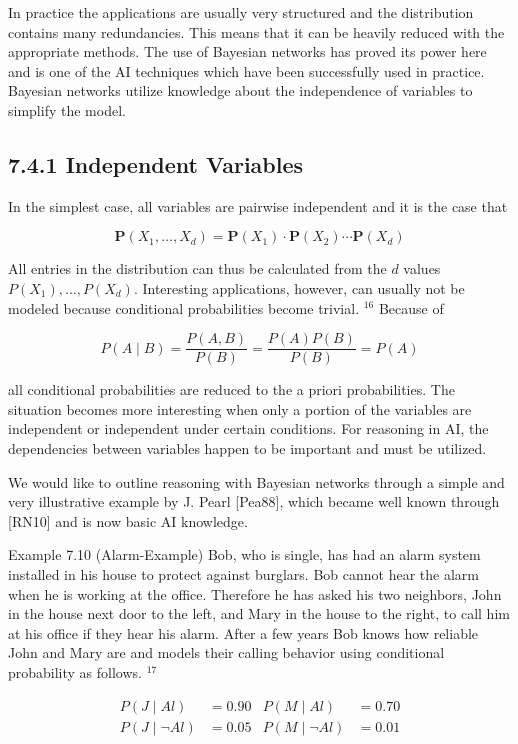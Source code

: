 \documentclass[10pt]{article}
\begin{document}
In practice the applications are usually very structured and the distribution contains many redundancies. This means that it can be heavily reduced with the appropriate methods. The use of Bayesian networks has proved its power here and is one of the AI techniques which have been successfully used in practice. Bayesian networks utilize knowledge about the independence of variables to simplify the model.

\subsection*{7.4.1 Independent Variables}
In the simplest case, all variables are pairwise independent and it is the case that

$$
\boldsymbol{P}\left(X_{1}, \ldots, X_{d}\right)=\boldsymbol{P}\left(X_{1}\right) \cdot \boldsymbol{P}\left(X_{2}\right) \cdots \boldsymbol{P}\left(X_{d}\right)
$$

All entries in the distribution can thus be calculated from the $d$ values $P\left(X_{1}\right), \ldots, P\left(X_{d}\right)$. Interesting applications, however, can usually not be modeled because conditional probabilities become trivial. ${ }^{16}$ Because of


$$
P(A \mid B)=\frac{P(A, B)}{P(B)}=\frac{P(A) P(B)}{P(B)}=P(A)
$$

all conditional probabilities are reduced to the a priori probabilities. The situation becomes more interesting when only a portion of the variables are independent or independent under certain conditions. For reasoning in AI, the dependencies between variables happen to be important and must be utilized.

We would like to outline reasoning with Bayesian networks through a simple and very illustrative example by J. Pearl [Pea88], which became well known through [RN10] and is now basic AI knowledge.

Example 7.10 (Alarm-Example) Bob, who is single, has had an alarm system installed in his house to protect against burglars. Bob cannot hear the alarm when he is working at the office. Therefore he has asked his two neighbors, John in the house next door to the left, and Mary in the house to the right, to call him at his office if they hear his alarm. After a few years Bob knows how reliable John and Mary are and models their calling behavior using conditional probability as follows. ${ }^{17}$

$$
\begin{array}{rlrl}
P(J \mid A l) & =0.90 & P(M \mid A l) & =0.70 \\
P(J \mid \neg A l) & =0.05 & P(M \mid \neg A l) & =0.01
\end{array}
$$
\end{document}
